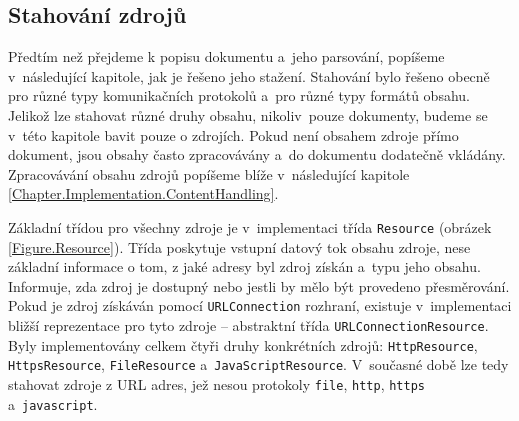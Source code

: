 \subsection{Stahování zdrojů}
\label{Chapter.Implementation.DownloadingResources}

Předtím než přejdeme k popisu dokumentu a~jeho parsování, popíšeme v~následující kapitole, jak je řešeno jeho stažení. Stahování bylo řešeno obecně pro různé typy komunikačních protokolů a~pro různé typy formátů obsahu. Jelikož lze stahovat různé druhy obsahu, nikoliv~pouze dokumenty, budeme se v~této kapitole bavit pouze o zdrojích. Pokud není obsahem zdroje přímo dokument, jsou obsahy často zpracovávány a~do dokumentu dodatečně vkládány. Zpracovávání obsahu zdrojů popíšeme blíže v~následující kapitole \ref{Chapter.Implementation.ContentHandling}.

Základní třídou pro všechny zdroje je v~implementaci třída \texttt{Resource} (obrázek \ref{Figure.Resource}). Třída poskytuje vstupní datový tok obsahu zdroje, nese základní informace o tom, z jaké adresy byl zdroj získán a~typu jeho obsahu. Informuje, zda zdroj je dostupný nebo jestli by mělo být provedeno přesměrování. Pokud je zdroj získáván pomocí \texttt{URLConnection} rozhraní, existuje v~implementaci bližší reprezentace pro tyto zdroje -- abstraktní třída \texttt{URLConnectionResource}. Byly implementovány celkem čtyři druhy konkrétních zdrojů: \texttt{HttpResource}, \texttt{HttpsResource}, \texttt{FileResource} a~\texttt{JavaScriptResource}. V~současné době lze tedy stahovat zdroje z URL adres, jež nesou protokoly \texttt{file}, \texttt{http}, \texttt{https} a~\texttt{javascript}.

